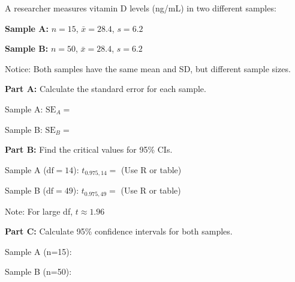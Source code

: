 \documentclass[11pt]{article}
\begin{document}
A researcher measures vitamin D levels (ng/mL) in two different samples:

\vspace{0.3cm}

\textbf{Sample A:} $n = 15$, $\bar{x} = 28.4$, $s = 6.2$

\textbf{Sample B:} $n = 50$, $\bar{x} = 28.4$, $s = 6.2$

\vspace{6pt}

Notice: Both samples have the same mean and SD, but different sample sizes.

\vspace{6pt}

\textbf{Part A:} Calculate the standard error for each sample.

\vspace{0.3cm}

Sample A: $\text{SE}_A = $

\vspace{2cm}

Sample B: $\text{SE}_B = $

\vspace{2cm}

\textbf{Part B:} Find the critical values for 95\% CIs.

\vspace{0.3cm}

Sample A ($\text{df} = 14$): $t_{0.975, 14} = $ \hspace{1cm} (Use R or table)

\vspace{1cm}

Sample B ($\text{df} = 49$): $t_{0.975, 49} = $ \hspace{1cm} (Use R or table)

\vspace{1cm}

Note: For large df, $t \approx 1.96$

\vspace{1cm}

\textbf{Part C:} Calculate 95\% confidence intervals for both samples.

\vspace{0.3cm}

Sample A (n=15):

\vspace{3cm}

Sample B (n=50):

\vspace{3cm}
\end{document}
